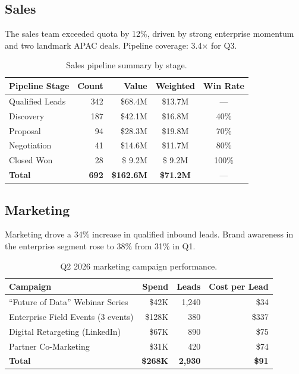 \documentclass[
    language=english,
    doctype=quarterly-report,
    institution=none,
]{../../omnilatex}
\begin{document}
\subsection{Sales}

The sales team exceeded quota by 12\%, driven by strong enterprise momentum
and two landmark APAC deals. Pipeline coverage: 3.4$\times$ for Q3.

\begin{table}[h]
    \centering
    \begin{tabular}{lrrcc}
        \toprule
        \textbf{Pipeline Stage} & \textbf{Count} & \textbf{Value} & \textbf{Weighted} & \textbf{Win Rate} \\
        \midrule
        Qualified Leads       & 342  & \$68.4M & \$13.7M & --- \\
        Discovery             & 187  & \$42.1M & \$16.8M & 40\% \\
        Proposal              & 94   & \$28.3M & \$19.8M & 70\% \\
        Negotiation           & 41   & \$14.6M & \$11.7M & 80\% \\
        Closed Won            & 28   & \$ 9.2M & \$ 9.2M & 100\% \\
        \midrule
        \textbf{Total}        & \textbf{692} & \textbf{\$162.6M} & \textbf{\$71.2M} & --- \\
        \bottomrule
    \end{tabular}
    \caption{Sales pipeline summary by stage.}
\end{table}

\subsection{Marketing}

Marketing drove a 34\% increase in qualified inbound leads. Brand awareness
in the enterprise segment rose to 38\% from 31\% in Q1.

\begin{table}[h]
    \centering
    \begin{tabular}{lrrr}
        \toprule
        \textbf{Campaign} & \textbf{Spend} & \textbf{Leads} & \textbf{Cost per Lead} \\
        \midrule
        ``Future of Data'' Webinar Series  & \$42K  & 1,240 & \$34 \\
        Enterprise Field Events (3 events) & \$128K & 380   & \$337 \\
        Digital Retargeting (LinkedIn)      & \$67K  & 890   & \$75 \\
        Partner Co-Marketing               & \$31K  & 420   & \$74 \\
        \midrule
        \textbf{Total}                     & \textbf{\$268K} & \textbf{2,930} & \textbf{\$91} \\
        \bottomrule
    \end{tabular}
    \caption{Q2 2026 marketing campaign performance.}
\end{table}
\end{document}
